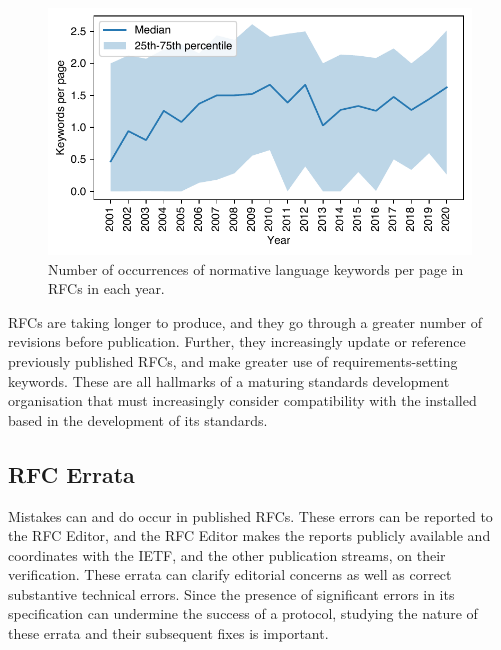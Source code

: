 \documentclass[twocolumn,10pt]{article}
\newlength{\figureWidthOneColumn}
\newcommand{\pb}[1]{\vspace{0.75ex}\noindent{\textbf{#1}}}
\begin{document}
\begin{figure}
  \centering
  \includegraphics[width=\figureWidthOneColumn]{figures-prev/imc-2021/documents/keyword_usage_rate.pdf}
  \caption{
    Number of occurrences of normative language keywords per page in RFCs
    in each year.
  }
  \label{fig:keyword_usage_rates}
\end{figure}

\pb{Summary:}
RFCs are taking longer to produce, and they go through a greater number
of revisions before publication. Further, they increasingly update or
reference previously published RFCs, and make greater use of
requirements-setting keywords. These are all hallmarks of a maturing
standards development organisation that must increasingly consider
compatibility with the installed based in the development of its standards.


\subsection{RFC Errata}
\label{sec:trends-documents:errata}


Mistakes can and do occur in published RFCs.  These errors can be reported
to the RFC Editor, and the RFC Editor makes the reports publicly available
and coordinates with the IETF, and the other publication streams, on their
verification. These errata can clarify editorial concerns as well as correct
substantive technical errors. Since the presence of significant errors in
its specification can undermine the success of a protocol, studying the
nature of these errata and their subsequent fixes is important.
\end{document}
